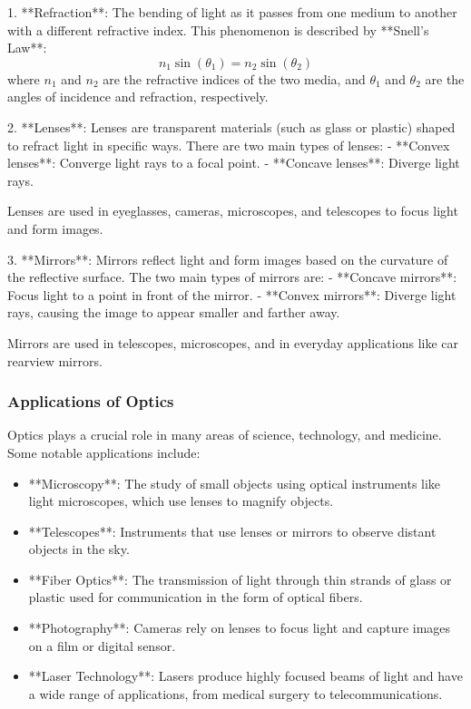 \documentclass{article}
\begin{document}
1. **Refraction**: The bending of light as it passes from one medium to another with a different refractive index. This phenomenon is described by **Snell’s Law**:
   \[
   n_1 \sin(\theta_1) = n_2 \sin(\theta_2)
   \]
   where \( n_1 \) and \( n_2 \) are the refractive indices of the two media, and \( \theta_1 \) and \( \theta_2 \) are the angles of incidence and refraction, respectively.

2. **Lenses**: Lenses are transparent materials (such as glass or plastic) shaped to refract light in specific ways. There are two main types of lenses:
   - **Convex lenses**: Converge light rays to a focal point.
   - **Concave lenses**: Diverge light rays.

   Lenses are used in eyeglasses, cameras, microscopes, and telescopes to focus light and form images.

3. **Mirrors**: Mirrors reflect light and form images based on the curvature of the reflective surface. The two main types of mirrors are:
   - **Concave mirrors**: Focus light to a point in front of the mirror.
   - **Convex mirrors**: Diverge light rays, causing the image to appear smaller and farther away.

   Mirrors are used in telescopes, microscopes, and in everyday applications like car rearview mirrors.

\subsubsection*{Applications of Optics}

Optics plays a crucial role in many areas of science, technology, and medicine. Some notable applications include:

\begin{itemize}
    \item **Microscopy**: The study of small objects using optical instruments like light microscopes, which use lenses to magnify objects.
    \item **Telescopes**: Instruments that use lenses or mirrors to observe distant objects in the sky.
    \item **Fiber Optics**: The transmission of light through thin strands of glass or plastic used for communication in the form of optical fibers.
    \item **Photography**: Cameras rely on lenses to focus light and capture images on a film or digital sensor.
    \item **Laser Technology**: Lasers produce highly focused beams of light and have a wide range of applications, from medical surgery to telecommunications.
\end{itemize}
\end{document}

